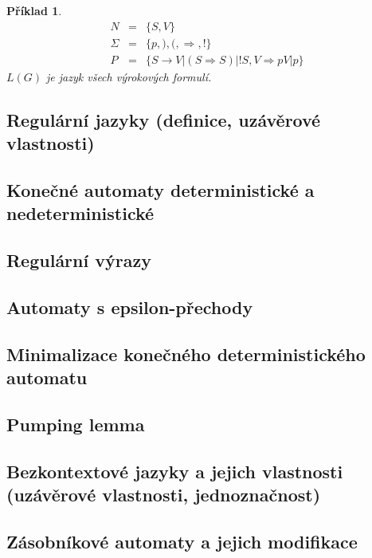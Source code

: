 \documentclass[10pt,a4paper]{article}
\theoremstyle{note}
\newtheorem{priklad}{Příklad}
\begin{document}
\begin{priklad}
\begin{eqnarray*}
N &=& \lbrace S, V \rbrace \\
\Sigma &=& \lbrace p,),(, \Rightarrow, ! \rbrace \\
P &=& \lbrace S \rightarrow V|(S \Rightarrow S)|!S, V \Rightarrow pV|p \rbrace
\end{eqnarray*}
$L(G)$ je jazyk všech výrokových formulí.
\end{priklad}



	\subsection{Regulární jazyky (definice, uzávěrové vlastnosti)}

	\subsection{Konečné automaty deterministické a nedeterministické}

	\subsection{Regulární výrazy}

	\subsection{Automaty s epsilon-přechody}

	\subsection{Minimalizace konečného deterministického automatu}

	\subsection{Pumping lemma}

	\subsection{Bezkontextové jazyky a jejich vlastnosti (uzávěrové vlastnosti, jednoznačnost)}

	\subsection{Zásobníkové automaty a jejich modifikace}
\end{document}
